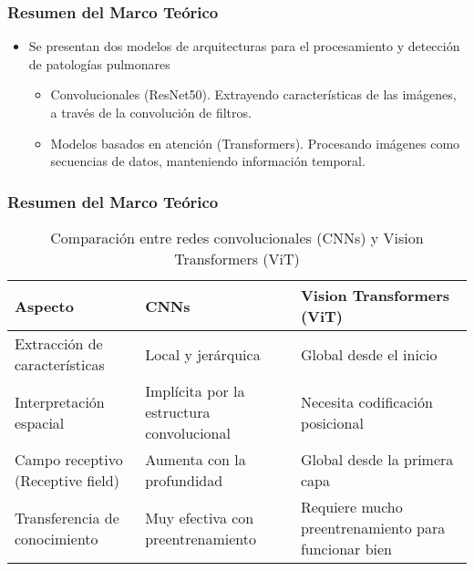 \begin{frame}
\frametitle{Resumen del Marco Teórico}
\begin{itemize}
    \item Se presentan dos modelos de arquitecturas para el procesamiento y detección de patologías pulmonares
        \begin{itemize}
            \item Convolucionales (ResNet50). Extrayendo características de las imágenes, a través de la convolución de filtros.
            \item Modelos basados en atención (Transformers). Procesando imágenes como secuencias de datos, manteniendo información temporal.
        \end{itemize}
\end{itemize}
\end{frame}

\begin{frame}
\frametitle{Resumen del Marco Teórico}
\begin{table}[h!]
    \centering
    \fontsize{8}{9}\selectfont
    \begin{tabular}{|p{2.5cm}|p{3cm}|p{3cm}|}
        \hline
        \textbf{Aspecto} & \textbf{CNNs} & \textbf{Vision Transformers (ViT)} \\
        \hline
        Extracción de características & Local y jerárquica & Global desde el inicio \\
        \hline
        Interpretación espacial & Implícita por la estructura convolucional & Necesita codificación posicional \\
        \hline
        Campo receptivo (Receptive field) & Aumenta con la profundidad & Global desde la primera capa \\
        \hline
        Transferencia de conocimiento & Muy efectiva con preentrenamiento & Requiere mucho preentrenamiento para funcionar bien \\
        \hline
    \end{tabular}
    \caption{Comparación entre redes convolucionales (CNNs) y Vision Transformers (ViT)}
    \label{tab:comparacion_cnns_vit}
\end{table}
\end{frame}
